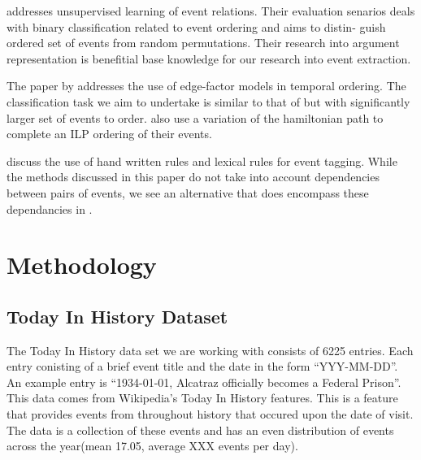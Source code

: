 \documentclass[bsc,frontabs,twoside,singlespacing,parskip,deptreport]{infthesis}     %
\begin{document}
\cite{chambers2009unsupervised}addresses unsupervised learning of event relations. Their evaluation
senarios deals with binary classification related to event ordering and aims to distin-
guish ordered set of events from random permutations. Their research into argument representation is benefitial base
knowledge for our research into event extraction.

The paper by \cite{abend2015lexical} addresses the use of
edge-factor models in temporal ordering. The classification task we aim to undertake is similar to that of \cite{abend2015lexical}
but with significantly larger set of events to order. \cite{abend2015lexical} also use a variation of the hamiltonian path
to complete an ILP ordering of their events.

\cite{mani2006machine} discuss the use of hand written rules and lexical rules for event tagging. While the methods discussed in this paper
do not take into account dependencies between pairs of events, we see an alternative that does encompass
these dependancies in \cite{schapire1998learning}.  


\chapter{Methodology}


\section{Today In History Dataset}
The Today In History data set we are working with consists of 6225 entries. Each entry conisting
of a  brief event title and the date in the form ``YYY-MM-DD''.
An example entry is ``1934-01-01, Alcatraz officially becomes a Federal Prison''.
This data comes from Wikipedia's Today In History features. This is a feature that provides events from
throughout history that occured upon the date of visit. The data is a collection of these events and has
an even distribution of events across the year(mean 17.05, average XXX events per day).
\end{document}
